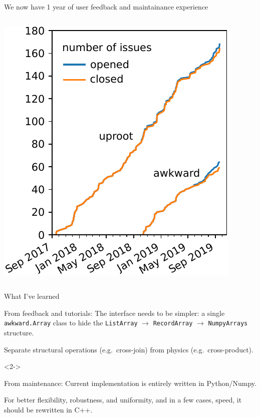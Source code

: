 \documentclass[aspectratio=169]{beamer}
\begin{document}
\begin{frame}{We now have 1 year of user feedback and maintainance experience}
\begin{columns}
\vspace{0.2 cm}
\hspace{-0.25 cm}\includegraphics[width=\linewidth]{uproot-issues.pdf}
\end{columns}
\end{frame}

\begin{frame}{What I've learned}
\large
\vspace{0.5 cm}
\begin{block}{\Large From feedback and tutorials:}
\vspace{0.2 cm}
The interface needs to be simpler: a single \texttt{awkward.Array} class to hide the \texttt{ListArray} $\to$ \texttt{RecordArray} $\to$ \texttt{NumpyArrays} structure.

\vspace{0.2 cm}
Separate structural operations (e.g.\ cross-join) from physics (e.g.\ cross-product).
\end{block}

\vspace{0.5 cm}
\begin{uncoverenv}<2->
\begin{block}{\Large From maintenance:}
\vspace{0.2 cm}
Current implementation is entirely written in Python/Numpy.

\vspace{0.2 cm}
For better flexibility, robustness, and uniformity, and in a few cases, speed, it should be rewritten in C++.
\end{block}
\end{uncoverenv}
\end{frame}
\end{document}
